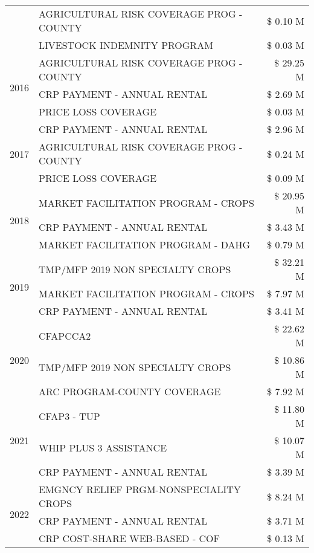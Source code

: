 \begin{tabular}{llr}
 & AGRICULTURAL RISK COVERAGE PROG - COUNTY & \$ 0.10 M \\
 & LIVESTOCK INDEMNITY PROGRAM & \$ 0.03 M \\
\cline{1-3}
\multirow[t]{3}{*}{2016} & AGRICULTURAL RISK COVERAGE PROG - COUNTY & \$ 29.25 M \\
 & CRP PAYMENT - ANNUAL RENTAL & \$ 2.69 M \\
 & PRICE LOSS COVERAGE & \$ 0.03 M \\
\cline{1-3}
\multirow[t]{3}{*}{2017} & CRP PAYMENT - ANNUAL RENTAL & \$ 2.96 M \\
 & AGRICULTURAL RISK COVERAGE PROG - COUNTY & \$ 0.24 M \\
 & PRICE LOSS COVERAGE & \$ 0.09 M \\
\cline{1-3}
\multirow[t]{3}{*}{2018} & MARKET FACILITATION PROGRAM - CROPS & \$ 20.95 M \\
 & CRP PAYMENT - ANNUAL RENTAL & \$ 3.43 M \\
 & MARKET FACILITATION PROGRAM - DAHG & \$ 0.79 M \\
\cline{1-3}
\multirow[t]{3}{*}{2019} & TMP/MFP 2019 NON SPECIALTY CROPS & \$ 32.21 M \\
 & MARKET FACILITATION PROGRAM - CROPS & \$ 7.97 M \\
 & CRP PAYMENT - ANNUAL RENTAL & \$ 3.41 M \\
\cline{1-3}
\multirow[t]{3}{*}{2020} & CFAPCCA2 & \$ 22.62 M \\
 & TMP/MFP 2019 NON SPECIALTY CROPS & \$ 10.86 M \\
 & ARC PROGRAM-COUNTY COVERAGE & \$ 7.92 M \\
\cline{1-3}
\multirow[t]{3}{*}{2021} & CFAP3 - TUP & \$ 11.80 M \\
 & WHIP PLUS 3 ASSISTANCE & \$ 10.07 M \\
 & CRP PAYMENT - ANNUAL RENTAL & \$ 3.39 M \\
\cline{1-3}
\multirow[t]{3}{*}{2022} & EMGNCY RELIEF PRGM-NONSPECIALITY CROPS & \$ 8.24 M \\
 & CRP PAYMENT - ANNUAL RENTAL & \$ 3.71 M \\
 & CRP COST-SHARE WEB-BASED - COF & \$ 0.13 M \\
\cline{1-3}
\bottomrule
\end{tabular}
